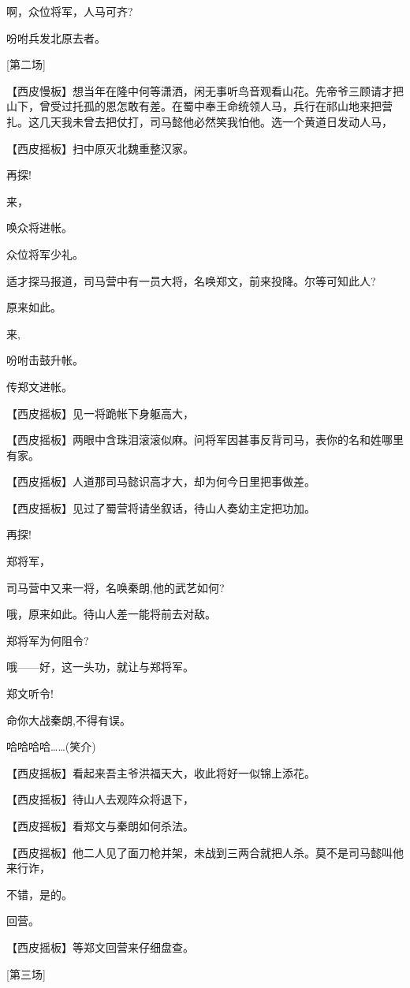 啊，众位将军，人马可齐?

吩咐兵发北原去者。

{[}第二场{]}

【西皮慢板】想当年在隆中何等潇洒，闲无事听鸟音观看山花。先帝爷三顾请才把山下，曾受过托孤的恩怎敢有差。在蜀中奉王命统领人马，兵行在祁山地来把营扎。这几天我未曾去把仗打，司马懿他必然笑我怕他。选一个黄道日发动人马，

【西皮摇板】扫中原灭北魏重整汉家。

再探!

来，

唤众将进帐。

众位将军少礼。

适才探马报道，司马营中有一员大将，名唤郑文，前来投降。尔等可知此人?

原来如此。

来,

吩咐击鼓升帐。

传郑文进帐。

【西皮摇板】见一将跪帐下身躯高大，

【西皮摇板】两眼中含珠泪滚滚似麻。问将军因甚事反背司马，表你的名和姓哪里有家。

【西皮摇板】人道那司马懿识高才大，却为何今日里把事做差。

【西皮摇板】见过了蜀营将请坐叙话，待山人奏幼主定把功加。

再探!

郑将军，

司马营中又来一将，名唤秦朗,他的武艺如何?

哦，原来如此。待山人差一能将前去对敌。

郑将军为何阻令?

哦------好，这一头功，就让与郑将军。

郑文听令!

命你大战秦朗,不得有误。

哈哈哈哈\ldots{}\ldots{}(笑介)

【西皮摇板】看起来吾主爷洪福天大，收此将好一似锦上添花。

【西皮摇板】待山人去观阵众将退下，

【西皮摇板】看郑文与秦朗如何杀法。

【西皮摇板】他二人见了面刀枪并架，未战到三两合就把人杀。莫不是司马懿叫他来行诈，

不错，是的。

回营。

【西皮摇板】等郑文回营来仔细盘查。

{[}第三场{]}

